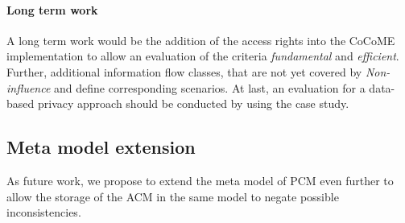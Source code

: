 \paragraph{Long term work}
A long term work would be the addition of the access rights into the CoCoME implementation to allow an evaluation of the criteria \textit{fundamental} and \textit{efficient}. Further, additional information flow classes, that are not yet covered by \textit{Non-influence} and define corresponding scenarios. At last, an evaluation for a data-based privacy approach should be conducted by using the case study. 
\subsection{Meta model extension}
As future work, we propose to extend the meta model of PCM even further to allow the storage of the ACM in the same model to negate possible inconsistencies.
